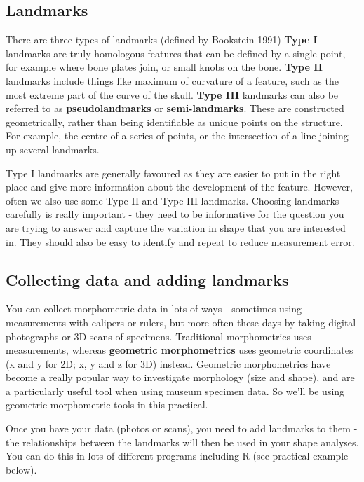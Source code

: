\documentclass[]{book}
\begin{document}
\subsection{Landmarks}\label{landmarks}

There are three types of landmarks (defined by Bookstein 1991)
\textbf{Type I} landmarks are truly homologous features that can be
defined by a single point, for example where bone plates join, or small
knobs on the bone. \textbf{Type II} landmarks include things like
maximum of curvature of a feature, such as the most extreme part of the
curve of the skull. \textbf{Type III} landmarks can also be referred to
as \textbf{pseudolandmarks} or \textbf{semi-landmarks}. These are
constructed geometrically, rather than being identifiable as unique
points on the structure. For example, the centre of a series of points,
or the intersection of a line joining up several landmarks.

Type I landmarks are generally favoured as they are easier to put in the
right place and give more information about the development of the
feature. However, often we also use some Type II and Type III landmarks.
Choosing landmarks carefully is really important - they need to be
informative for the question you are trying to answer and capture the
variation in shape that you are interested in. They should also be easy
to identify and repeat to reduce measurement error.

\subsection{Collecting data and adding
landmarks}\label{collecting-data-and-adding-landmarks}

You can collect morphometric data in lots of ways - sometimes using
measurements with calipers or rulers, but more often these days by
taking digital photographs or 3D scans of specimens. Traditional
morphometrics uses measurements, whereas \textbf{geometric
morphometrics} uses geometric coordinates (x and y for 2D; x, y and z
for 3D) instead. Geometric morphometrics have become a really popular
way to investigate morphology (size and shape), and are a particularly
useful tool when using museum specimen data. So we'll be using geometric
morphometric tools in this practical.

Once you have your data (photos or scans), you need to add landmarks to
them - the relationships between the landmarks will then be used in your
shape analyses. You can do this in lots of different programs including
R (see practical example below).
\end{document}
